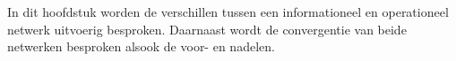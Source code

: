 
\chapter{}
\label{ch:stand-van-zaken}





In dit hoofdstuk worden de verschillen tussen een informationeel en operationeel netwerk uitvoerig besproken. Daarnaast wordt de convergentie van beide netwerken besproken alsook de voor- en nadelen.
\section{}
\label{sec:Informatie technologie}
